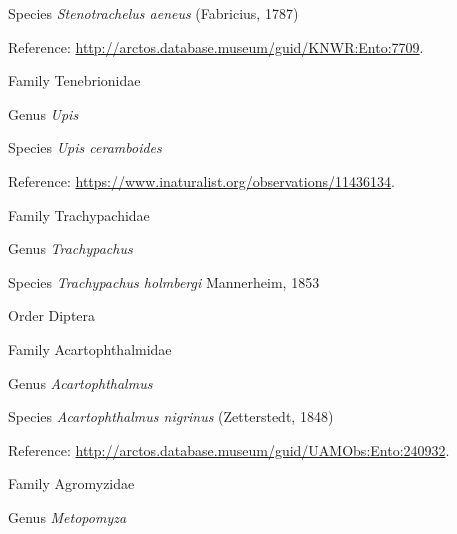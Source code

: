 \documentclass[9pt, article]{memoir}
\begin{document}
\begin{multicols}{2}
\vspace{6pt}\noindent\hspace{36pt}Species \textit{Stenotrachelus aeneus} (Fabricius, 1787)


Reference: 
\url{http://arctos.database.museum/guid/KNWR:Ento:7709}.

\vspace{6pt}\noindent\hspace{24pt}Family Tenebrionidae


\vspace{6pt}\noindent\hspace{30pt}Genus \textit{Upis}


\vspace{6pt}\noindent\hspace{36pt}Species \textit{Upis ceramboides}


Reference: 
\url{https://www.inaturalist.org/observations/11436134}.

\vspace{6pt}\noindent\hspace{24pt}Family Trachypachidae


\vspace{6pt}\noindent\hspace{30pt}Genus \textit{Trachypachus}


\vspace{6pt}\noindent\hspace{36pt}Species \textit{Trachypachus holmbergi} Mannerheim, 1853


\vspace{6pt}\noindent\hspace{18pt}Order Diptera


\vspace{6pt}\noindent\hspace{24pt}Family Acartophthalmidae


\vspace{6pt}\noindent\hspace{30pt}Genus \textit{Acartophthalmus}


\vspace{6pt}\noindent\hspace{36pt}Species \textit{Acartophthalmus nigrinus} (Zetterstedt, 1848)


Reference: 
\url{http://arctos.database.museum/guid/UAMObs:Ento:240932}.

\vspace{6pt}\noindent\hspace{24pt}Family Agromyzidae


\vspace{6pt}\noindent\hspace{30pt}Genus \textit{Metopomyza}



\end{multicols}
\end{document}
